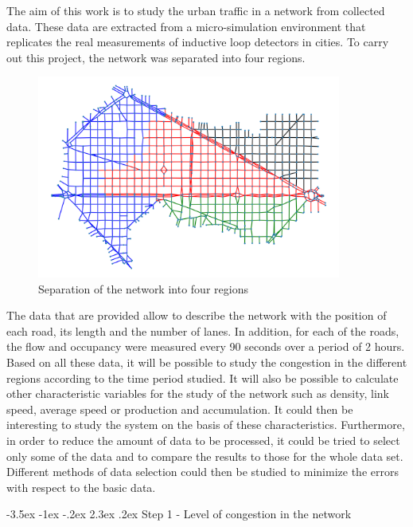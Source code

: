 \documentclass[a4paper, 12pt,oneside]{article}
\makeatletter
\renewcommand{\section}{\@startsection {section}{1}{\z@}%
             {-3.5ex \@plus -1ex \@minus -.2ex}%
             {2.3ex \@plus.2ex}%
             {\normalfont\normalsize\bfseries}}
\makeatother
\begin{document}
The aim of this work is to study the urban traffic in a network from collected data. These data are extracted from a micro-simulation environment that replicates the real measurements of inductive loop detectors in cities. To carry out this project, the network was separated into four regions.

\begin{figure}[H]
    \begin{center}
        \includegraphics[width=10cm]{Images/Graph 4 regions.png}
        \caption{Separation of the network into four regions}
        \label{Separation of the network into four regions}
    \end{center}
\end{figure}


The data that are provided allow to describe the network with the position of each road, its length and the number of lanes. In addition, for each of the roads, the flow and occupancy were measured every 90 seconds over a period of 2 hours.\\
Based on all these data, it will be possible to study the congestion in the different regions according to the time period studied. It will also be possible to calculate other characteristic variables for the study of the network such as density, link speed, average speed or production and accumulation. It could then be interesting to study the system on the basis of these characteristics. Furthermore, in order to reduce the amount of data to be processed, it could be tried to select only some of the data and to compare the results to those for the whole data set. Different methods of data selection could then be studied to minimize the errors with respect to the basic data.


\section{Step 1 - Level of congestion in the network}
\end{document}
